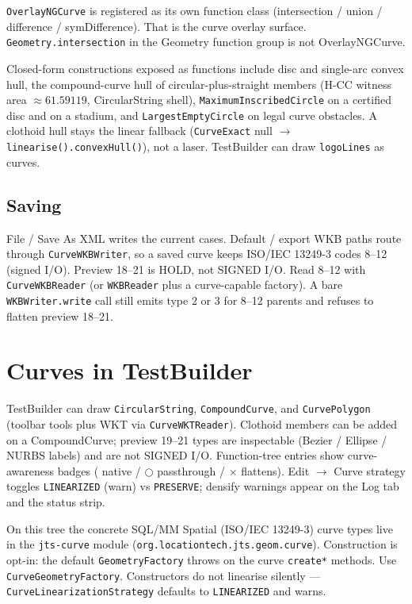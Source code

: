 \documentclass[11pt]{article}
\begin{document}
\texttt{OverlayNGCurve} is registered as its own function class
(intersection / union / difference / symDifference). That is the
curve overlay surface. \texttt{Geometry.intersection} in the Geometry
function group is not OverlayNGCurve.

Closed-form constructions exposed as functions include disc and
single-arc convex hull, the compound-curve hull of
circular-plus-straight members (H-CC witness area $\approx 61.59119$,
CircularString shell), \texttt{MaximumInscribedCircle} on a
certified disc and on a stadium, and \texttt{LargestEmptyCircle} on
legal curve obstacles. A clothoid hull stays the linear fallback
(\texttt{CurveExact} null $\rightarrow$
\texttt{linearise().convexHull()}), not a laser.
TestBuilder can draw \texttt{logoLines} as curves.

\subsection{Saving}
File / Save As XML writes the current cases. Default / export WKB
paths route through \texttt{CurveWKBWriter}, so a saved curve keeps
ISO/IEC 13249-3 codes 8--12 (signed I/O). Preview 18--21 is HOLD,
not SIGNED I/O. Read 8--12 with \texttt{CurveWKBReader} (or
\texttt{WKBReader} plus a curve-capable factory). A bare
\texttt{WKBWriter.write} call still emits type 2 or 3 for 8--12
parents and refuses to flatten preview 18--21.

\section{Curves in TestBuilder}
TestBuilder can draw \texttt{CircularString}, \texttt{CompoundCurve},
and \texttt{CurvePolygon} (toolbar tools plus WKT via
\texttt{CurveWKTReader}). Clothoid members can be added on a
CompoundCurve; preview 19--21 types are inspectable (Bezier /
Ellipse / NURBS labels) and are not SIGNED I/O. Function-tree
entries show curve-awareness badges
(\textbullet{} native / $\bigcirc$ passthrough / $\times$ flattens).
Edit $\rightarrow$ Curve strategy toggles
\texttt{LINEARIZED} (warn) vs \texttt{PRESERVE}; densify warnings
appear on the Log tab and the status strip.

On this tree the concrete SQL/MM Spatial (ISO/IEC 13249-3) curve
types live in the
\texttt{jts-curve} module
(\texttt{org.locationtech.jts.geom.curve}). Construction is opt-in:
the default \texttt{GeometryFactory} throws on the curve
\texttt{create*} methods. Use \texttt{CurveGeometryFactory}.
Constructors do not linearise silently ---
\texttt{CurveLinearizationStrategy} defaults to \texttt{LINEARIZED}
and warns.
\end{document}
